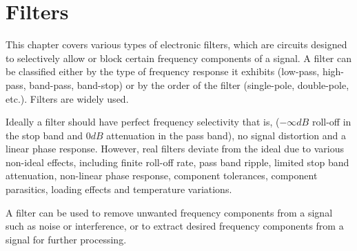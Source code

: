 \chapter{Filters}

This chapter covers various types of electronic filters,
which are circuits designed to selectively allow or block
certain frequency components of a signal. A filter can
be classified either by the type of frequency response it
exhibits (low-pass, high-pass, band-pass, band-stop) or
by the order of the filter (single-pole, double-pole, etc.).
Filters are widely used.

Ideally a filter should have perfect frequency selectivity
that is, (\(-\infty dB\) roll-off in the stop band and \(0 dB\)
attenuation in the pass band), no signal distortion and a
linear phase response. However, real filters deviate from
the ideal due to various non-ideal effects, including finite
roll-off rate, pass band ripple, limited stop band
attenuation, non-linear phase response, component tolerances,
component parasitics, loading effects and temperature
variations.

A filter can be used to remove unwanted frequency components
from a signal such as noise or interference, or to extract
desired frequency components from a signal for further
processing.




